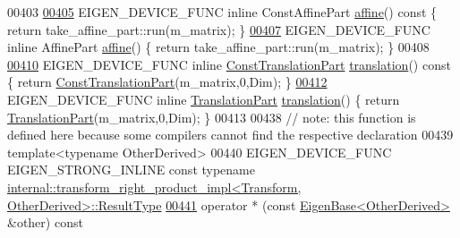 \begin{DoxyCode}
00403 
\hyperlink{group___geometry___module_a88c996ca4cccf46ab4d520b7d99c332b}{00405}   EIGEN\_DEVICE\_FUNC \textcolor{keyword}{inline} ConstAffinePart \hyperlink{group___geometry___module_a88c996ca4cccf46ab4d520b7d99c332b}{affine}()\textcolor{keyword}{ const }\{ \textcolor{keywordflow}{return} take\_affine\_part::run(m\_matrix); \}
\hyperlink{group___geometry___module_a77b379a598ff0e570a8112db65111a94}{00407}   EIGEN\_DEVICE\_FUNC \textcolor{keyword}{inline} AffinePart \hyperlink{group___geometry___module_a77b379a598ff0e570a8112db65111a94}{affine}() \{ \textcolor{keywordflow}{return} take\_affine\_part::run(m\_matrix); \}
00408 
\hyperlink{group___geometry___module_afa93ba97d26912bb3d8777cbed102045}{00410}   EIGEN\_DEVICE\_FUNC \textcolor{keyword}{inline} \hyperlink{group___core___module_class_eigen_1_1_block}{ConstTranslationPart} \hyperlink{group___geometry___module_afa93ba97d26912bb3d8777cbed102045}{translation}()\textcolor{keyword}{ const }\{ \textcolor{keywordflow}{return}
       \hyperlink{group___core___module_class_eigen_1_1_block}{ConstTranslationPart}(m\_matrix,0,Dim); \}
\hyperlink{group___geometry___module_ae76fc36f20276787741859cb5ebd5901}{00412}   EIGEN\_DEVICE\_FUNC \textcolor{keyword}{inline} \hyperlink{group___core___module_class_eigen_1_1_block}{TranslationPart} \hyperlink{group___geometry___module_ae76fc36f20276787741859cb5ebd5901}{translation}() \{ \textcolor{keywordflow}{return} 
      \hyperlink{group___core___module_class_eigen_1_1_block}{TranslationPart}(m\_matrix,0,Dim); \}
00413 
00438   \textcolor{comment}{// note: this function is defined here because some compilers cannot find the respective declaration}
00439   \textcolor{keyword}{template}<\textcolor{keyword}{typename} OtherDerived>
00440   EIGEN\_DEVICE\_FUNC EIGEN\_STRONG\_INLINE \textcolor{keyword}{const} \textcolor{keyword}{typename} 
      \hyperlink{struct_eigen_1_1internal_1_1transform__right__product__impl}{internal::transform\_right\_product\_impl<Transform, OtherDerived>::ResultType}
\hyperlink{group___geometry___module_a4e44db730819ead6e555cf325cea3fd6}{00441}   operator * (\textcolor{keyword}{const} \hyperlink{group___core___module_struct_eigen_1_1_eigen_base}{EigenBase<OtherDerived>} &other)\textcolor{keyword}{ const}

\end{DoxyCode}
